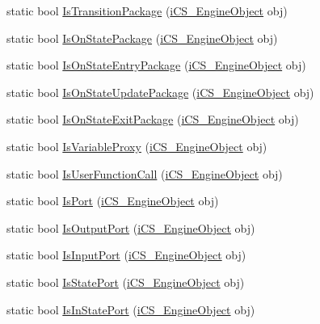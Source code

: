 \begin{DoxyCompactItemize}
\item 
static bool \hyperlink{classi_c_s___object_type_a36c591c9627bd86e39f4ed3d8c462e75}{Is\+Transition\+Package} (\hyperlink{classi_c_s___engine_object}{i\+C\+S\+\_\+\+Engine\+Object} obj)
\item 
static bool \hyperlink{classi_c_s___object_type_a587a19c41c72041223bb5a19a5391580}{Is\+On\+State\+Package} (\hyperlink{classi_c_s___engine_object}{i\+C\+S\+\_\+\+Engine\+Object} obj)
\item 
static bool \hyperlink{classi_c_s___object_type_a9dbf929bbd9bfa48052073533bc6419f}{Is\+On\+State\+Entry\+Package} (\hyperlink{classi_c_s___engine_object}{i\+C\+S\+\_\+\+Engine\+Object} obj)
\item 
static bool \hyperlink{classi_c_s___object_type_a65a50af57acbcddc789275339e581aad}{Is\+On\+State\+Update\+Package} (\hyperlink{classi_c_s___engine_object}{i\+C\+S\+\_\+\+Engine\+Object} obj)
\item 
static bool \hyperlink{classi_c_s___object_type_a8ef1f4d9641611d5af0b724d9c2cc746}{Is\+On\+State\+Exit\+Package} (\hyperlink{classi_c_s___engine_object}{i\+C\+S\+\_\+\+Engine\+Object} obj)
\item 
static bool \hyperlink{classi_c_s___object_type_a28380a5956430484483384d7442fbd57}{Is\+Variable\+Proxy} (\hyperlink{classi_c_s___engine_object}{i\+C\+S\+\_\+\+Engine\+Object} obj)
\item 
static bool \hyperlink{classi_c_s___object_type_a4f6f69576b9e15144eda0a20246759ae}{Is\+User\+Function\+Call} (\hyperlink{classi_c_s___engine_object}{i\+C\+S\+\_\+\+Engine\+Object} obj)
\item 
static bool \hyperlink{classi_c_s___object_type_aa578aaadce0bcce0e1b30cc2d86e030d}{Is\+Port} (\hyperlink{classi_c_s___engine_object}{i\+C\+S\+\_\+\+Engine\+Object} obj)
\item 
static bool \hyperlink{classi_c_s___object_type_a55614cb5f9353a4245db1cbe50e25f04}{Is\+Output\+Port} (\hyperlink{classi_c_s___engine_object}{i\+C\+S\+\_\+\+Engine\+Object} obj)
\item 
static bool \hyperlink{classi_c_s___object_type_a620f33e79d848a6d53e5e5b516b38ae6}{Is\+Input\+Port} (\hyperlink{classi_c_s___engine_object}{i\+C\+S\+\_\+\+Engine\+Object} obj)
\item 
static bool \hyperlink{classi_c_s___object_type_a2e41fb55a8b85db6de5623445fabd942}{Is\+State\+Port} (\hyperlink{classi_c_s___engine_object}{i\+C\+S\+\_\+\+Engine\+Object} obj)
\item 
static bool \hyperlink{classi_c_s___object_type_a87834c8b28eea002af45c8cefadfc03e}{Is\+In\+State\+Port} (\hyperlink{classi_c_s___engine_object}{i\+C\+S\+\_\+\+Engine\+Object} obj)

\end{DoxyCompactItemize}
